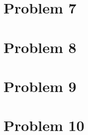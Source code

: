 \documentclass{article}
\begin{document}
\section*{Problem 7}

\section*{Problem 8}

\section*{Problem 9}

\section*{Problem 10}
\end{document}
